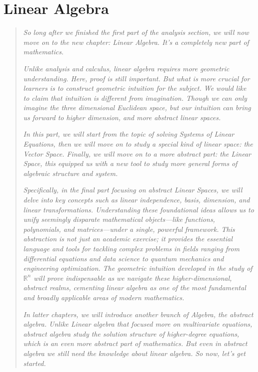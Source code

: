 \chapter{Linear Algebra}
\begin{quote}
\emph{
So long after we finished the first part of the analysis section, we will now move on to the new chapter: Linear Algebra. It's a completely new part of mathematics.
}

\emph{
Unlike analysis and calculus, linear algebra requires more geometric understanding. Here, proof is still important. But what is more crucial for learners is to construct geometric intuition for the subject. We would like to claim that intuition is different from imagination. Though we can only imagine the three dimensional Euclidean space, but our intuition can bring us forward to higher dimension, and more abstract linear spaces.
}

\emph{
In this part, we will start from the topic of solving Systems of Linear Equations, then we will move on to study a special kind of linear space: the Vector Space. Finally, we will move on to a more abstract part: the Linear Space, this equipped us with a new tool to study more general forms of algebraic structure and system.
}

\emph{
Specifically, in the final part focusing on abstract Linear Spaces, we will delve into key concepts such as linear independence, basis, dimension, and linear transformations. Understanding these foundational ideas allows us to unify seemingly disparate mathematical objects—like functions, polynomials, and matrices—under a single, powerful framework. This abstraction is not just an academic exercise; it provides the essential language and tools for tackling complex problems in fields ranging from differential equations and data science to quantum mechanics and engineering optimization. The geometric intuition developed in the study of $\mathbb{R}^n$ will prove indispensable as we navigate these higher-dimensional, abstract realms, cementing linear algebra as one of the most fundamental and broadly applicable areas of modern mathematics.
}

\emph{
In latter chapters, we will introduce another branch of Algebra, the abstract algebra. Unlike Linear algebra that focused more on multivariate equations, abstract algebra study the solution structure of higher-degree equations, which is an even more abstract part of mathematics. But even in abstract algebra we still need the knowledge about linear algebra. So now, let's get started.
}
\end{quote}

